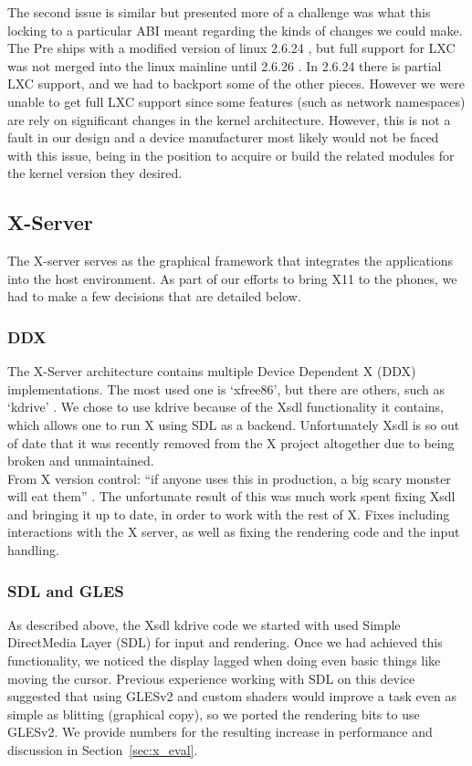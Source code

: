     The second issue is similar but presented more of a challenge was what this locking to a particular ABI meant regarding the kinds of changes we could make.  The Pre ships with a modified version of linux 2.6.24 \cite{pre_kernel}, but full support for LXC was not merged into the linux mainline until 2.6.26 \cite{lxc_kernel}.  In 2.6.24 there is partial LXC support, and we had to backport some of the other pieces.  However we were unable to get full LXC support since some features (such as network namespaces) are rely on significant changes in the kernel architecture.  However, this is not a fault in our design and a device manufacturer most likely would not be faced with this issue, being in the position to acquire or build the related modules for the kernel version they desired. \\


\subsection{X-Server}

The X-server serves as the graphical framework that integrates the applications into the host environment.  As part of our efforts to bring X11 to the phones, we had to make a few decisions that are detailed below. \\

\subsubsection{DDX}
The X-Server architecture contains multiple Device Dependent X (DDX) implementations.  The most used one is `xfree86', but there are others, such as `kdrive' \cite{x_glossary}.  We chose to use kdrive because of the Xsdl functionality it contains, which allows one to run X using SDL as a backend.  Unfortunately Xsdl is so out of date that it was recently removed from the X project altogether due to being broken and unmaintained. \\

From X version control: ``if anyone uses this in production, a big scary monster will eat them'' \cite{x_quote}.  The unfortunate result of this was much work spent fixing Xsdl and bringing it up to date, in order to work with the rest of X.  Fixes including interactions with the X server, as well as fixing the rendering code and the input handling. \\

\subsubsection{SDL and GLES}
As described above, the Xsdl kdrive code we started with used Simple DirectMedia Layer (SDL) \cite{sdl} for input and rendering.  Once we had achieved this functionality, we noticed the display lagged when doing even basic things like moving the cursor.  Previous experience working with SDL on this device suggested that using GLESv2 \cite{gles} and custom shaders would improve a task even as simple as blitting (graphical copy), so we ported the rendering bits to use GLESv2.  We provide numbers for the resulting increase in performance and discussion in Section~\ref{sec:x_eval}.

